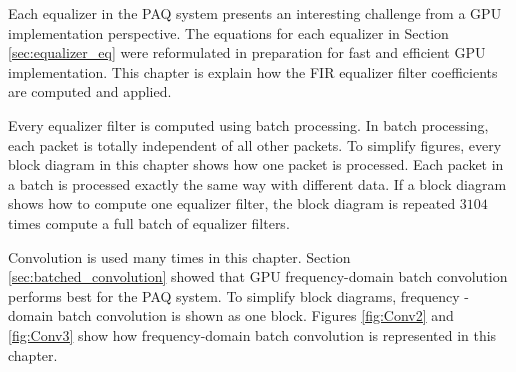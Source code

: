 %

\label{chap:equalizers_in_gpus}
Each equalizer in the PAQ system presents an interesting challenge from a GPU implementation perspective.
The equations for each equalizer in Section \ref{sec:equalizer_eq} were reformulated in preparation for fast and efficient GPU implementation.
This chapter is explain how the FIR equalizer filter coefficients are computed and applied.

Every equalizer filter is computed using batch processing.
In batch processing, each packet is totally independent of all other packets.
To simplify figures, every block diagram in this chapter shows how one packet is processed.
Each packet in a batch is processed exactly the same way with different data.
If a block diagram shows how to compute one equalizer filter, the block diagram is repeated $3104$ times compute a full batch of equalizer filters.

Convolution is used many times in this chapter.
Section \ref{sec:batched_convolution} showed that GPU frequency-domain batch convolution performs best for the PAQ system.
To simplify block diagrams, frequency -domain batch convolution is shown as one block.
Figures \ref{fig:Conv2} and \ref{fig:Conv3} show how frequency-domain batch convolution is represented in this chapter.

